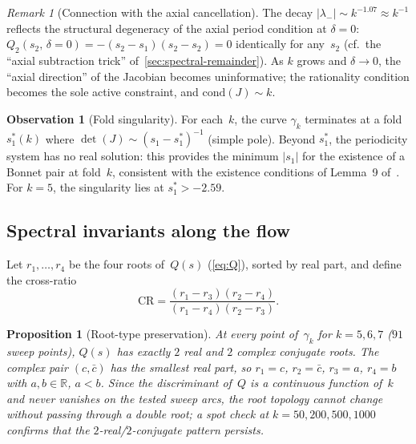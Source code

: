 \documentclass[11pt,a4paper]{article}
\theoremstyle{plain}
\newtheorem{proposition}[theorem]{Proposition}
\theoremstyle{definition}
\newtheorem{observation}[theorem]{Observation}
\theoremstyle{remark}
\newtheorem{remark}[theorem]{Remark}
\newcommand{\RR}{\mathbb{R}}
\newcommand{\abs}[1]{\lvert #1 \rvert}
\begin{document}
\begin{remark}[Connection with the axial cancellation]
\label{rem:axial-eigenvalue}
The decay $\abs{\lambda_-} \sim k^{-1.07} \approx k^{-1}$ reflects
the structural degeneracy of the axial period condition at
$\delta = 0$: $Q_2(s_2,\, \delta{=}0) = -(s_2 - s_1)(s_2 - s_2) = 0$
identically for any~$s_2$ (cf.\ the ``axial subtraction trick''
of~\cref{sec:spectral-remainder}).  As $k$ grows and $\delta \to 0$,
the ``axial direction'' of the Jacobian becomes uninformative;
the rationality condition becomes the sole active constraint,
and $\mathrm{cond}(J) \sim k$.
\end{remark}

\begin{observation}[Fold singularity]
\label{obs:fold}
For each~$k$, the curve $\gamma_k$ terminates at a fold
$s_1^*(k)$ where $\det(J) \sim (s_1 - s_1^*)^{-1}$ (simple pole).
Beyond $s_1^*$, the periodicity system has no real solution:
this provides the minimum $\abs{s_1}$ for the existence of a
Bonnet pair at fold~$k$, consistent with the existence conditions
of Lemma~9 of~\cite{BHS-comp}.
For $k = 5$, the singularity lies at $s_1^* > -2.59$.
\end{observation}

\subsection{Spectral invariants along the flow}%
\label{sec:spectral-inv}

Let $r_1, \ldots, r_4$ be the four roots of~$Q(s)$
(\cref{eq:Q}), sorted by real part, and define the
cross-ratio
\begin{equation}
  \mathrm{CR}
  = \frac{(r_1 - r_3)(r_2 - r_4)}{(r_1 - r_4)(r_2 - r_3)}.
  \label{eq:CR}
\end{equation}

\begin{proposition}[Root-type preservation]
\label{prop:root-type}
At every point of~$\gamma_k$ for $k = 5, 6, 7$
($91$ sweep points), $Q(s)$ has exactly $2$ real and $2$
complex conjugate roots.  The complex pair $(c,\bar c)$ has
the smallest real part, so $r_1 = c$, $r_2 = \bar c$,
$r_3 = a$, $r_4 = b$ with $a, b \in \RR$, $a < b$.
Since the discriminant of~$Q$ is a continuous function of~$k$
and never vanishes on the tested sweep arcs, the root topology
cannot change without passing through a double root;
a spot check at $k = 50, 200, 500, 1000$ confirms that the
$2$-real/$2$-conjugate pattern persists.
\end{proposition}
\end{document}
